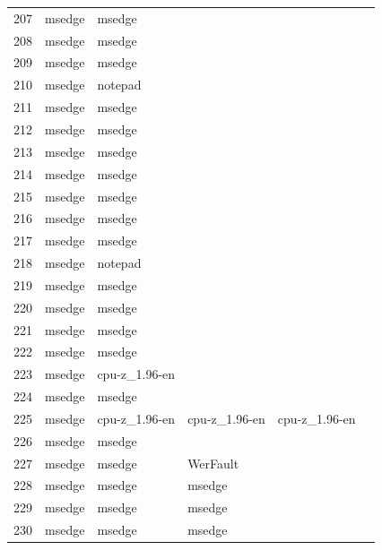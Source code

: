 \documentclass[a4paper,twoside,12pt]{book}
\begin{document}
\begin{appendices}
\begin{table}
\begin{tabular}{llllll}
		207 &  msedge &         msedge &                &                &                \\
		208 &  msedge &         msedge &                &                &                \\
		209 &  msedge &         msedge &                &                &                \\
		210 &  msedge &        notepad &                &                &                \\
		211 &  msedge &         msedge &                &                &                \\
		212 &  msedge &         msedge &                &                &                \\
		213 &  msedge &         msedge &                &                &                \\
		214 &  msedge &         msedge &                &                &                \\
		215 &  msedge &         msedge &                &                &                \\
		216 &  msedge &         msedge &                &                &                \\
		217 &  msedge &         msedge &                &                &                \\
		218 &  msedge &        notepad &                &                &                \\
		219 &  msedge &         msedge &                &                &                \\
		220 &  msedge &         msedge &                &                &                \\
		221 &  msedge &         msedge &                &                &                \\
		222 &  msedge &         msedge &                &                &                \\
		223 &  msedge &  cpu-z\_1.96-en &                &                &                \\
		224 &  msedge &         msedge &                &                &                \\
		225 &  msedge &  cpu-z\_1.96-en &  cpu-z\_1.96-en &  cpu-z\_1.96-en &                \\
		226 &  msedge &         msedge &                &                &                \\
		227 &  msedge &         msedge &       WerFault &                &                \\
		228 &  msedge &         msedge &         msedge &                &                \\
		229 &  msedge &         msedge &         msedge &                &                \\
		230 &  msedge &         msedge &         msedge &                &                \\
		\bottomrule
	\end{tabular}		
\end{table}


\end{appendices}
\end{document}
